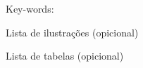 \vspace*{1\baselineskip}

Key-words: 


\newpage

\thispagestyle{empty}

Lista de ilustrações (opicional)

\newpage

\thispagestyle{empty}

Lista de tabelas (opicional)

